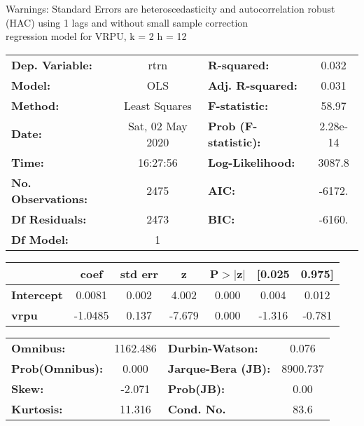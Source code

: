 Warnings: \newline
 [1] Standard Errors are heteroscedasticity and autocorrelation robust (HAC) using 1 lags and without small sample correction\\ 

regression model for VRPU, k = 2 h = 12\begin{center}
\begin{tabular}{lclc}
\toprule
\textbf{Dep. Variable:}    &       rtrn       & \textbf{  R-squared:         } &     0.032   \\
\textbf{Model:}            &       OLS        & \textbf{  Adj. R-squared:    } &     0.031   \\
\textbf{Method:}           &  Least Squares   & \textbf{  F-statistic:       } &     58.97   \\
\textbf{Date:}             & Sat, 02 May 2020 & \textbf{  Prob (F-statistic):} &  2.28e-14   \\
\textbf{Time:}             &     16:27:56     & \textbf{  Log-Likelihood:    } &    3087.8   \\
\textbf{No. Observations:} &        2475      & \textbf{  AIC:               } &    -6172.   \\
\textbf{Df Residuals:}     &        2473      & \textbf{  BIC:               } &    -6160.   \\
\textbf{Df Model:}         &           1      & \textbf{                     } &             \\
\bottomrule
\end{tabular}
\begin{tabular}{lcccccc}
                   & \textbf{coef} & \textbf{std err} & \textbf{z} & \textbf{P$> |$z$|$} & \textbf{[0.025} & \textbf{0.975]}  \\
\midrule
\textbf{Intercept} &       0.0081  &        0.002     &     4.002  &         0.000        &        0.004    &        0.012     \\
\textbf{vrpu}      &      -1.0485  &        0.137     &    -7.679  &         0.000        &       -1.316    &       -0.781     \\
\bottomrule
\end{tabular}
\begin{tabular}{lclc}
\textbf{Omnibus:}       & 1162.486 & \textbf{  Durbin-Watson:     } &    0.076  \\
\textbf{Prob(Omnibus):} &   0.000  & \textbf{  Jarque-Bera (JB):  } & 8900.737  \\
\textbf{Skew:}          &  -2.071  & \textbf{  Prob(JB):          } &     0.00  \\
\textbf{Kurtosis:}      &  11.316  & \textbf{  Cond. No.          } &     83.6  \\
\bottomrule
\end{tabular}
\end{center}

